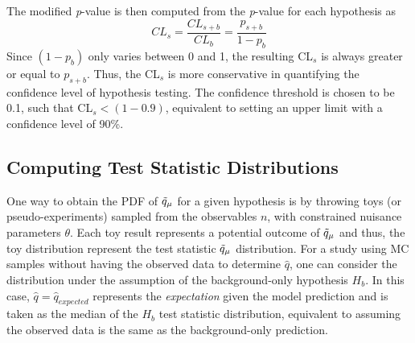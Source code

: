 The modified \textit{p}-value is then computed from the \textit{p}-value for each hypothesis as \cite{asymptotic_test, CLs_Junk, CLs_Read}
\begin{equation}
\label{eq:cls}
    CL_{s} = \frac{CL_{s+b}}{CL_b}= \frac{p_{s+b}}{1-p_b}
\end{equation}
Since $(1 - p_b)$ only varies between 0 and 1, the resulting CL$_s$ is always greater or equal to $p_{s+b}$.
Thus, the CL$_{s}$ is more conservative in quantifying the confidence level of hypothesis testing.
The confidence threshold is chosen to be 0.1, such that CL$_{s} < (1 - 0.9)$, equivalent to setting an upper limit with a confidence level of 90\%.

\subsection{Computing Test Statistic Distributions}

One way to obtain the PDF of $\Tilde{q}_\mu$ for a given hypothesis is by throwing toys (or pseudo-experiments) sampled from the observables $n$, with constrained nuisance parameters $\theta$. 
Each toy result represents a potential outcome of $\Tilde{q}_\mu$ and thus, the toy distribution represent the test statistic $\Tilde{q}_\mu$ distribution.
For a study using MC samples without having the observed data to determine $\hat{q}$, one can consider the distribution under the assumption of the background-only hypothesis $H_b$.
In this case, $\hat{q} = \hat{q}_{expected}$ represents the \textit{expectation} given the model prediction and is taken as the median of the $H_b$ test statistic distribution, equivalent to assuming the observed data is the same as the background-only prediction. 

